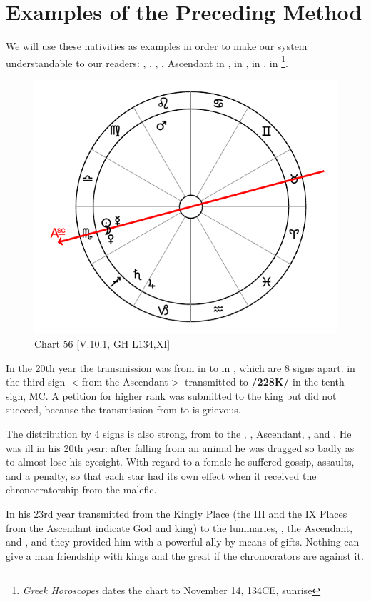 \section{Examples of the Preceding Method}

We will use these nativities as examples in order to make our system understandable to our readers: \Sun, \Moon, \Venus, \Mercury, Ascendant in \Scorpio, \Saturn\xspace in \Sagittarius, \Jupiter\xspace in \Capricorn, \Mars\xspace in \Leo\footnote{\textit{Greek Horoscopes} dates the chart to November 14, 134CE, sunrise}. 

\begin{figure}
\centering
\vspace{-20pt}
\includegraphics[width=.68\textwidth]{charts/5_10_1}
\caption{Chart 56 [V.10.1, GH L134,XI]}
\label{fig:chart56}
\end{figure}

In the 20th year the transmission was from \Jupiter\xspace in \Capricorn\xspace to \Mars\xspace in \Leo, which are 8 signs
apart. \Jupiter\xspace in the third sign $<$from the Ascendant$>$ transmitted to \Mars\xspace \textbf{/228K/} in the tenth sign, MC.
A petition for higher rank was submitted to the king but did not succeed, because the transmission from \Jupiter\xspace to \Mars\xspace is grievous. 

The distribution by 4 signs is also strong, from \Mars\xspace to the \Sun, \Moon, Ascendant, \Mercury, and \Venus. He was ill in his 20th year: after falling from an animal he was dragged so badly as to almost lose his eyesight. With regard to a female he suffered gossip, assaults, and a penalty, so that each star had its own effect when it received the chronocratorship from the malefic. 

In his 23rd year \Jupiter transmitted from the Kingly Place (the III and the IX Places from the Ascendant indicate God and king) to the luminaries, \Venus, the Ascendant, and \Mercury, and they provided him with a powerful ally by means of gifts. Nothing can give a man friendship with kings and the great if the chronocrators are against it.

